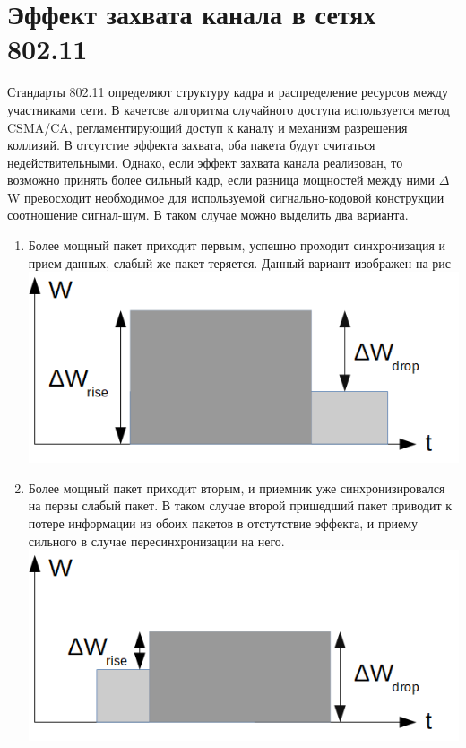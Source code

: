 \documentclass{llncs}
\begin{document}
\section{Эффект захвата канала в сетях 802.11}
Стандарты 802.11 определяют структуру кадра и распределение ресурсов между участниками сети. В качетсве алгоритма случайного доступа используется метод CSMA/CA, регламентирующий  доступ к каналу и механизм разрешения коллизий. В отсутстие эффекта захвата, оба пакета будут считаться недействительными. Однако, если эффект захвата канала реализован, то возможно принять более сильный кадр, если разница мощностей между ними $\Delta$W превосходит необходимое для используемой сигнально-кодовой конструкции соотношение сигнал-шум. В таком случае можно выделить два варианта.
\begin{enumerate}
\item Более мощный пакет приходит первым, успешно проходит синхронизация и прием данных, слабый же пакет теряется. Данный вариант изображен на рис\\
\includegraphics[scale=0.5]{capture effect init.png}
 
\item Более мощный пакет приходит вторым, и приемник уже синхронизировался на первы слабый пакет. В таком случае второй пришедший пакет приводит к потере информации из обоих пакетов в отстутствие эффекта, и приему сильного в случае пересинхронизации на него.
\\
\includegraphics[scale=0.5]{capture effect scenario 1.png} 
\end{enumerate}
\end{document}
